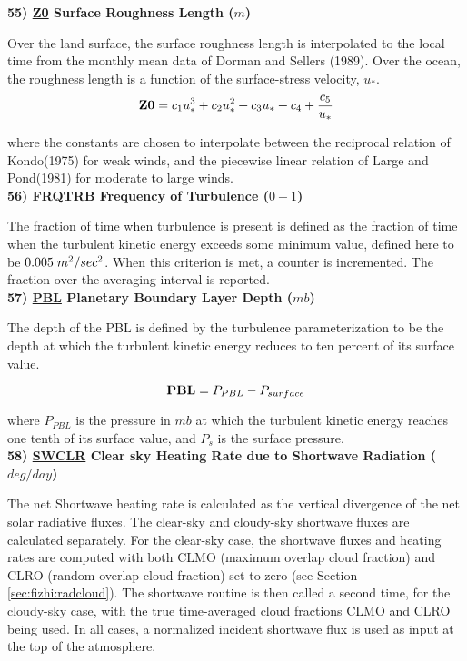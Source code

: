 \noindent
{\bf 55)  \underline {Z0}  Surface Roughness Length ($m$) }

\noindent
Over the land surface, the surface roughness length is interpolated to the local
time from the monthly mean data of Dorman and Sellers (1989). Over the ocean,
the roughness length is a function of the surface-stress velocity, $u_*$.
\[
{\bf Z0} = c_1u^3_* + c_2u^2_* + c_3u_* + c_4 + {c_5 \over {u_*}}
\]

\noindent
where the constants are chosen to interpolate between the reciprocal relation of
Kondo(1975) for weak winds, and the piecewise linear relation of Large and Pond(1981) 
for moderate to large winds.
\\
 
\noindent
{\bf 56)  \underline {FRQTRB}  Frequency of Turbulence ($0-1$) }

\noindent
The fraction of time when turbulence is present is defined as the fraction of
time when the turbulent kinetic energy exceeds some minimum value, defined here
to be $0.005 \hspace{.1cm}m^2/sec^2$. When this criterion is met, a counter is
incremented. The fraction over the averaging interval is reported.
\\
 
\noindent
{\bf 57)  \underline {PBL}  Planetary Boundary Layer Depth ($mb$) }

\noindent
The depth of the PBL is defined by the turbulence parameterization to be the
depth at which the turbulent kinetic energy reduces to ten percent of its surface
value.

\[
{\bf PBL} = P_{PBL} - P_{surface}
\]

\noindent
where $P_{PBL}$ is the pressure in $mb$ at which the turbulent kinetic energy
reaches one tenth of its surface value, and $P_s$ is the surface pressure.
\\
 
\noindent
{\bf 58)  \underline {SWCLR} Clear sky Heating Rate due to Shortwave Radiation ($deg/day$) }

\noindent
The net Shortwave heating rate is calculated as the vertical divergence of the
net solar radiative fluxes.
The clear-sky and cloudy-sky shortwave fluxes are calculated separately.
For the clear-sky case, the shortwave fluxes and heating rates are computed with
both CLMO (maximum overlap cloud fraction) and
CLRO (random overlap cloud fraction) set to zero (see Section \ref{sec:fizhi:radcloud}).
The shortwave routine is then called a second time, for the cloudy-sky case, with the
true time-averaged cloud fractions CLMO
and CLRO being used.  In all cases, a normalized incident shortwave flux is used as
input at the top of the atmosphere.

